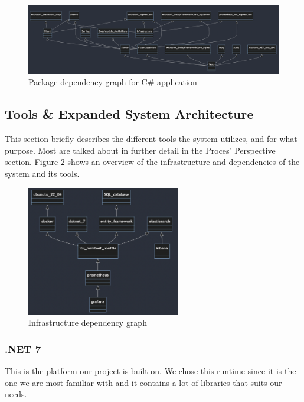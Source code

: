 \begin{figure}[H]
    \centering
    \includegraphics[width = \textwidth]{Images/dependencies2.png}
    \caption{Package dependency graph for C\# application}
    \label{fig:packageDependencyGraph}
    \centering
\end{figure}

\subsection{Tools \& Expanded System Architecture}

This section briefly describes the different tools the system utilizes, and for what purpose. Most are talked about in further detail in the Proces' Perspective section. Figure  \ref{fig:infrastructureDependencyGrapg} shows an overview of the infrastructure and dependencies of the system and its tools. 

\begin{figure}[H]
    \centering
    \includegraphics[width = 0.6\textwidth]{Images/application_dependencies.png}
    \caption{Infrastructure dependency graph}
    \label{fig:infrastructureDependencyGrapg}
    \centering
\end{figure}


\subsubsection{.NET 7}
This is the platform our project is built on. We chose this runtime since it is the one we are most familiar with and it contains a lot of libraries that suits our needs. 

